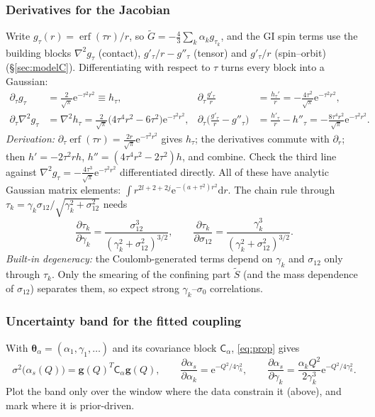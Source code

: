 \documentclass[11pt,a4paper]{article}
\numberwithin{equation}{section}
\theoremstyle{definition}
\theoremstyle{plain}
\theoremstyle{remark}
\numberwithin{algorithm}{section}
\newcommand{\as}{\alpha_s}
\newcommand{\dd}{\mathrm{d}}
\newcommand{\ee}{\mathrm{e}}
\newcommand{\erf}{\operatorname{erf}}
\newcommand{\sC}{\mathsf C}
\newcommand{\vth}{\bm\theta}
\newcommand{\vg}{\bm g}
\begin{document}
\subsubsection{Derivatives for the Jacobian}
Write $g_\tau(r)=\erf(\tau r)/r$, so $\tilde G=-\frac43\sum_k\alpha_kg_{\tau_k}$, and the GI spin terms use the building blocks $\nabla^2g_\tau$ (contact), $g'_\tau/r-g''_\tau$ (tensor) and $g'_\tau/r$ (spin--orbit) (\S\ref{sec:modelC}). Differentiating with respect to $\tau$ turns every block into a Gaussian:
\begin{align}
\partial_\tau g_\tau&=\frac{2}{\sqrt\pi}\ee^{-\tau^2r^2}\equiv h_\tau, &
\partial_\tau\frac{g'_\tau}{r}&=\frac{h_\tau'}{r}=-\frac{4\tau^2}{\sqrt\pi}\ee^{-\tau^2r^2},\nonumber\\
\partial_\tau\nabla^2g_\tau&=\nabla^2h_\tau=\frac{2}{\sqrt\pi}\big(4\tau^4r^2-6\tau^2\big)\ee^{-\tau^2r^2}, &
\partial_\tau\Big(\frac{g'_\tau}r-g''_\tau\Big)&=\frac{h'_\tau}r-h''_\tau=-\frac{8\tau^4r^2}{\sqrt\pi}\ee^{-\tau^2r^2}.
\label{eq:dtau}
\end{align}
\emph{Derivation:} $\partial_\tau\erf(\tau r)=\frac{2r}{\sqrt\pi}\ee^{-\tau^2r^2}$ gives $h_\tau$; the derivatives commute with $\partial_r$; then $h'=-2\tau^2rh$, $h''=(4\tau^4r^2-2\tau^2)h$, and combine. Check the third line against $\nabla^2g_\tau=-\frac{4\tau^3}{\sqrt\pi}\ee^{-\tau^2r^2}$ differentiated directly. All of these have analytic Gaussian matrix elements: $\int r^{2l+2+2j}\ee^{-(a+\tau^2)r^2}\dd r$. The chain rule through $\tau_k=\gamma_k\sigma_{12}/\sqrt{\gamma_k^2+\sigma_{12}^2}$ needs
\begin{equation}
\frac{\partial\tau_k}{\partial\gamma_k}=\frac{\sigma_{12}^3}{(\gamma_k^2+\sigma_{12}^2)^{3/2}},\qquad
\frac{\partial\tau_k}{\partial\sigma_{12}}=\frac{\gamma_k^3}{(\gamma_k^2+\sigma_{12}^2)^{3/2}}.
\end{equation}
\emph{Built-in degeneracy:} the Coulomb-generated terms depend on $\gamma_k$ and $\sigma_{12}$ only through $\tau_k$. Only the smearing of the confining part $\tilde S$ (and the mass dependence of $\sigma_{12}$) separates them, so expect strong $\gamma_k$--$\sigma_0$ correlations.

\subsubsection{Uncertainty band for the fitted coupling}
With $\vth_\alpha=(\alpha_1,\gamma_1,\dots)$ and its covariance block $\sC_\alpha$, \eqref{eq:prop} gives
\begin{equation}
\sigma^2\big(\as(Q)\big)=\vg(Q)^T\sC_\alpha\vg(Q),\qquad
\frac{\partial\as}{\partial\alpha_k}=\ee^{-Q^2/4\gamma_k^2},\qquad
\frac{\partial\as}{\partial\gamma_k}=\frac{\alpha_kQ^2}{2\gamma_k^3}\ee^{-Q^2/4\gamma_k^2}.
\end{equation}
Plot the band only over the window where the data constrain it (above), and mark where it is prior-driven.
\end{document}
